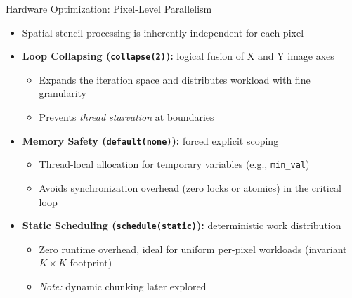 \documentclass{beamer}
\begin{document}
\begin{frame}{Hardware Optimization: Pixel-Level Parallelism}
  \begin{itemize}
    \item Spatial stencil processing is inherently independent for each pixel 
    \item \textbf{Loop Collapsing (\texttt{collapse(2)}):} logical fusion of X and Y image axes
      \begin{itemize}
        \item Expands the iteration space and distributes workload with fine granularity
        \item Prevents \textit{thread starvation} at boundaries
      \end{itemize}
    \item \textbf{Memory Safety (\texttt{default(none)}):} forced explicit scoping
      \begin{itemize}
        \item Thread-local allocation for temporary variables (e.g., \texttt{min\_val})
        \item Avoids synchronization overhead (zero locks or atomics) in the critical loop
      \end{itemize}
    \item \textbf{Static Scheduling (\texttt{schedule(static)}):} deterministic work distribution
      \begin{itemize}
        \item Zero runtime overhead, ideal for uniform per-pixel workloads (invariant $K \times K$ footprint)
        \item \textit{Note:} dynamic chunking later explored
      \end{itemize}
  \end{itemize}
\end{frame}
\end{document}
